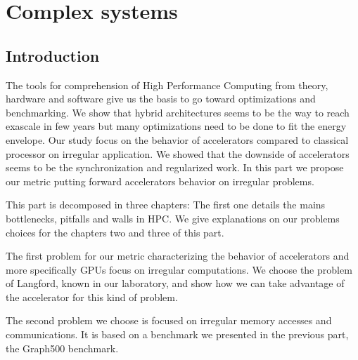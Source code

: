 \part{Complex systems}
\chapter*{Introduction}

The tools for comprehension of High Performance Computing from theory, hardware and software give us the basis to go toward optimizations and benchmarking. 
We show that hybrid architectures seems to be the way to reach exascale in few years but many optimizations need to be done to fit the energy envelope. 
Our study focus on the behavior of accelerators compared to classical processor on irregular application. 
We showed that the downside of accelerators seems to be the synchronization and regularized work. 
In this part we propose our metric putting forward accelerators behavior on irregular problems. 

This part is decomposed in three chapters:
The first one details the mains bottlenecks, pitfalls and walls in HPC.
We give explanations on our problems choices for the chapters two and three of this part. 

The first problem for our metric characterizing the behavior of accelerators and more specifically GPUs focus on irregular computations. 
We choose the problem of Langford, known in our laboratory, and show how we can take advantage of the accelerator for this kind of problem. 

The second problem we choose is focused on irregular memory accesses and communications. 
It is based on a benchmark we presented in the previous part, the Graph500 benchmark.






